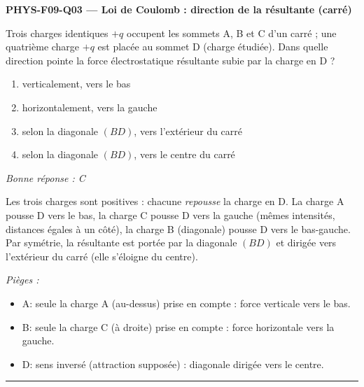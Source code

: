 \documentclass[11pt,a4paper]{article}
\begin{document}
\noindent\textbf{PHYS-F09-Q03 --- Loi de Coulomb : direction de la résultante (carré)}\par
Trois charges identiques $+q$ occupent les sommets A, B et C d'un carré ; une quatrième charge $+q$ est placée au sommet D (charge étudiée). Dans quelle direction pointe la force électrostatique résultante subie par la charge en D ?
\begin{center}
\end{center}
\begin{enumerate}[label=\Alph*)]
\item verticalement, vers le bas
\item horizontalement, vers la gauche
\item selon la diagonale $(BD)$, vers l'extérieur du carré
\item selon la diagonale $(BD)$, vers le centre du carré
\end{enumerate}
\textit{Bonne réponse : C}\par
Les trois charges sont positives : chacune \emph{repousse} la charge en D. La charge A pousse D vers le bas, la charge C pousse D vers la gauche (mêmes intensités, distances égales à un côté), la charge B (diagonale) pousse D vers le bas-gauche. Par symétrie, la résultante est portée par la diagonale $(BD)$ et dirigée vers l'extérieur du carré (elle s'éloigne du centre).\par
\textit{Pièges :}
\begin{itemize}
\item A: seule la charge A (au-dessus) prise en compte : force verticale vers le bas.
\item B: seule la charge C (à droite) prise en compte : force horizontale vers la gauche.
\item D: sens inversé (attraction supposée) : diagonale dirigée vers le centre.
\end{itemize}
\vspace{8pt}\hrule\vspace{8pt}
\end{document}
